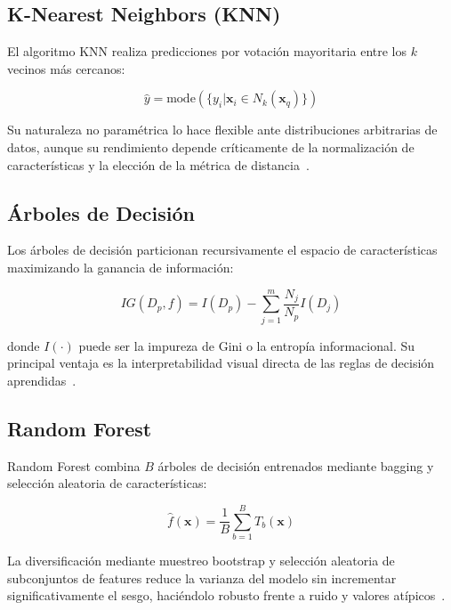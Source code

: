 \subsection{K-Nearest Neighbors (KNN)}

El algoritmo KNN realiza predicciones por votación mayoritaria entre los $k$ vecinos más cercanos:

\begin{equation}
    \hat{y} = \text{mode}(\{y_i | \mathbf{x}_i \in N_k(\mathbf{x}_q)\})
\end{equation}

Su naturaleza no paramétrica lo hace flexible ante distribuciones arbitrarias de datos, aunque su rendimiento depende críticamente de la normalización de características y la elección de la métrica de distancia~\cite{hastie2009}.

\subsection{Árboles de Decisión}

Los árboles de decisión particionan recursivamente el espacio de características maximizando la ganancia de información:

\begin{equation}
    IG(D_p, f) = I(D_p) - \sum_{j=1}^{m} \frac{N_j}{N_p} I(D_j)
\end{equation}

donde $I(\cdot)$ puede ser la impureza de Gini o la entropía informacional. Su principal ventaja es la interpretabilidad visual directa de las reglas de decisión aprendidas~\cite{breiman1984}.

\subsection{Random Forest}

Random Forest combina $B$ árboles de decisión entrenados mediante bagging y selección aleatoria de características:

\begin{equation}
    \hat{f}(\mathbf{x}) = \frac{1}{B} \sum_{b=1}^{B} T_b(\mathbf{x})
\end{equation}

La diversificación mediante muestreo bootstrap y selección aleatoria de subconjuntos de features reduce la varianza del modelo sin incrementar significativamente el sesgo, haciéndolo robusto frente a ruido y valores atípicos~\cite{breiman2001}.

